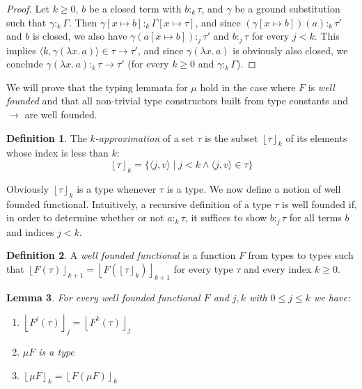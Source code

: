 \documentclass[12pt,a4paper,draft]{article}
\theoremstyle{definition}
\newtheorem{definition}{Definition}
\theoremstyle{plain}
\newtheorem{lemma}[definition]{Lemma}
\newcommand{\abstr}[2]{\ensuremath{\lambda{#1}.\,{#2}}}
\newcommand{\pair}[1]{\ensuremath{\langle{#1}\rangle}}
\newcommand{\floor}[1]{\ensuremath{\left\lfloor{#1}\right\rfloor}}
\begin{document}
\begin{proof}
  Let $k \ge 0$, $b$ be a closed term with $b :_k \tau$, and $\gamma$ be a ground substitution such
  that $\gamma :_k \Gamma$. Then $\gamma[x \mapsto b] :_k \Gamma[x \mapsto \tau]$, and since
  $(\gamma[x \mapsto b])(a) :_k \tau'$ and $b$ is closed, we also have $\gamma(a[x \mapsto b]) :_j \tau'$
  and $b :_j \tau$ for every $j < k$. This implies $\pair{k,\gamma(\abstr{x}{a})} \in \tau \to \tau'$,
  and since $\gamma(\abstr{x}{a})$ is obviously also closed, we conclude $\gamma(\abstr{x}{a}) :_k \tau \to \tau'$
  (for every $k \ge 0$ and $\gamma :_k \Gamma$).
\end{proof}

We will prove that the typing lemmata for $\mu$ hold in the case where $F$ is \emph{well founded} and
that all non-trivial type constructors built from type constants and $\to$ are well founded.

\begin{definition} \label{def:Approximation}
  The \emph{$k$-approximation} of a set $\tau$ is the subset $\floor{\tau}_k$ of its elements
  whose index is less than $k$:
  \[ \floor{\tau}_k = \{ \pair{j,v} \mid j < k \wedge \pair{j,v} \in \tau \} \]
\end{definition}

Obviously $\floor{\tau}_k$ is a type whenever $\tau$ is a type. We now define a notion of well founded
functional. Intuitively, a recursive definition of a type $\tau$ is well founded if, in order to determine
whether or not $a :_k \tau$, it suffices to show $b :_j \tau$ for all terms $b$ and indices $j < k$.

\begin{definition}
  A \emph{well founded functional} is a function $F$ from types to types such that
  $\floor{F\left(\tau\right)}_{k+1} = \floor{F\left(\floor{\tau}_k\right)}_{k+1}$
  for every type $\tau$ and every index $k \ge 0$.
\end{definition}

\begin{lemma}
  For every well founded functional $F$ and $j, k$ with $0 \le j \le k$ we have:
  \begin{enumerate}
  \item $\floor{F^j\left(\tau\right)}_j = \floor{F^k\left(\tau\right)}_j$
  \item $\mu F$ is a type
  \item $\floor{\mu F}_k = \floor{F \left(\mu F\right)}_k$
  \end{enumerate}
\end{lemma}
\end{document}
